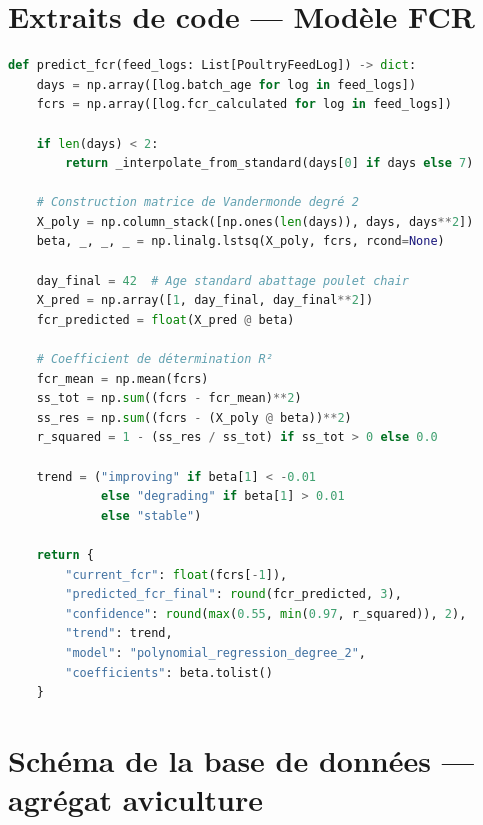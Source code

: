 \documentclass[12pt,a4paper,twoside]{report}
\begin{document}
\chapter{Extraits de code — Modèle FCR}
\label{ann:fcr_code}

\begin{lstlisting}[language=python, caption={Implémentation de la régression polynomiale FCR}]
def predict_fcr(feed_logs: List[PoultryFeedLog]) -> dict:
    days = np.array([log.batch_age for log in feed_logs])
    fcrs = np.array([log.fcr_calculated for log in feed_logs])

    if len(days) < 2:
        return _interpolate_from_standard(days[0] if days else 7)

    # Construction matrice de Vandermonde degré 2
    X_poly = np.column_stack([np.ones(len(days)), days, days**2])
    beta, _, _, _ = np.linalg.lstsq(X_poly, fcrs, rcond=None)

    day_final = 42  # Age standard abattage poulet chair
    X_pred = np.array([1, day_final, day_final**2])
    fcr_predicted = float(X_pred @ beta)

    # Coefficient de détermination R²
    fcr_mean = np.mean(fcrs)
    ss_tot = np.sum((fcrs - fcr_mean)**2)
    ss_res = np.sum((fcrs - (X_poly @ beta))**2)
    r_squared = 1 - (ss_res / ss_tot) if ss_tot > 0 else 0.0

    trend = ("improving" if beta[1] < -0.01
             else "degrading" if beta[1] > 0.01
             else "stable")

    return {
        "current_fcr": float(fcrs[-1]),
        "predicted_fcr_final": round(fcr_predicted, 3),
        "confidence": round(max(0.55, min(0.97, r_squared)), 2),
        "trend": trend,
        "model": "polynomial_regression_degree_2",
        "coefficients": beta.tolist()
    }
\end{lstlisting}

\chapter{Schéma de la base de données — agrégat aviculture}
\label{ann:schema_poultry}
\end{document}
